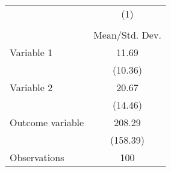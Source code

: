 {
\def\sym#1{\ifmmode^{#1}\else\(^{#1}\)\fi}
\begin{tabular}{l*{1}{c}}
\hline\hline
                    &\multicolumn{1}{c}{(1)}\\
                    &\multicolumn{1}{c}{}\\
                    &Mean/Std. Dev.\\
\hline
Variable 1          &       11.69\\
                    &     (10.36)\\
Variable 2          &       20.67\\
                    &     (14.46)\\
Outcome variable    &      208.29\\
                    &    (158.39)\\
\hline
Observations        &         100\\
\hline\hline
\end{tabular}
}
